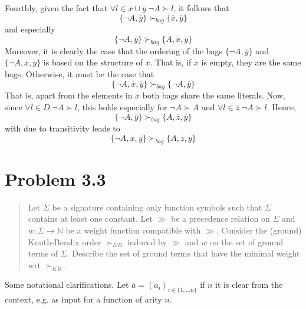 \documentclass[11pt,a4paper]{article}
\begin{document}
Fourthly, given the fact that $\forall l \in \overline{x} \cup \overline{y}  \;\neg A \succ l$, it follows that
\begin{equation*}
\{\neg A, \overline{y}\} \succ_{bag} \{\overline{x}, \overline{y}\}
\end{equation*}
and especially 
\begin{equation*}
\{\neg A, \overline{y}\} \succ_{bag} \{A, \overline{x}, \overline{y}\}
\end{equation*}
Moreover, it is clearly the case that the ordering of the bags $\{\neg A, \overline{y}\}$ and $\{\neg A,\overline{x}, \overline{y}\}$ is based on the structure of $\overline{x}$. That is, if $\overline{x}$ is empty, they are the same bags. Otherwise, it must be the case that 
\begin{equation*}
\{\neg A, \overline{x}, \overline{y}\} \succ_{bag} \{ \neg A,\overline{y}\}
\end{equation*}
That is, apart from the elements in $\overline{x}$ both bags share the same literals.
Now, since $\forall l \in D \; \neg A \succ l$, this holds especially for $\neg A \succ A$ and $\forall l \in \overline{z} \; \neg A \succ l$. Hence, 
\begin{equation*}
\{\neg A, \overline{y}\} \succ_{bag} \{ A, \overline{z}, \overline{y}\}
\end{equation*}
with due to transitivity leads to 
\begin{equation*}
\{\neg A, \overline{x}, \overline{y}\} \succ_{bag} \{ A, \overline{z}, \overline{y}\}
\end{equation*}


\section*{Problem 3.3}
\begin{quote}
Let $\Sigma$ be a signature containing only function symbols such that $\Sigma$ contains
at least one constant. Let $\gg$ be a precedence relation on $\Sigma$ and $w : \Sigma \to \mathbb{N}$ be a weight function
compatible with $\gg$. Consider the (ground) Knuth-Bendix order $\succ_{KB}$ induced by $\gg$ and $w$ on the set
of ground terms of $\Sigma$. Describe the set of ground terms that have the minimal weight wrt $\succ_{KB}$.
\end{quote}

Some notational clarifications. Let $\overline{a} =(a_i)_{i \in \{1, \dots n\}}$ if $n$ it is clear from the context, e.g. as input for a function of arity $n$.
\\
\end{document}
